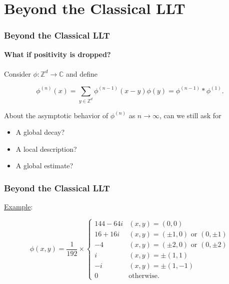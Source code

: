 \documentclass{beamer}
\theoremstyle{definition}
\begin{document}
\section{Beyond the Classical LLT}
\begin{frame}
\frametitle{Beyond the Classical LLT}
\textbf{What if positivity is dropped?}\\
$\,$\\

Consider $\phi: \mathbb{Z}^d \to \mathbb{C}$ and define 

\begin{equation*}
\phi^{(n)}(x)=\sum_{y\in\mathbb{Z}^d}\phi^{(n-1)}(x-y)\phi(y) = \phi^{(n-1)}\ast \phi^{(1)}.
\end{equation*}

%


About the asymptotic behavior of $\phi^{(n)}$ as $n\to \infty$, can we still ask for
\begin{itemize}
	\item A global decay?
	\item A local description?
	\item A global estimate?
\end{itemize}



\end{frame}





















\begin{frame}
\frametitle{Beyond the Classical LLT}



\underline{Example}:

\begin{equation*}
\phi(x,y) =
\frac{1}{192}\times
\begin{cases}
144 - 64i &(x,y) = (0,0)\\
16 + 16i &(x,y) = (\pm 1, 0)\mbox{ or }(0,\pm 1)\\
-4        &(x,y) = (\pm 2,0)\mbox{ or }(0,\pm 2)\\
i   &(x,y) = \pm(1,1)\\
-i   &(x,y) = \pm(1,-1)\\
0& \text{otherwise}.
\end{cases}
\end{equation*}

\end{frame}
\end{document}
